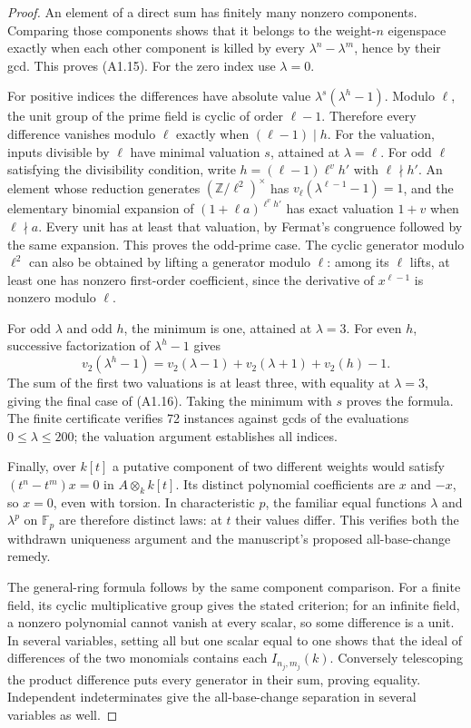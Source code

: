 \begin{proof}
An element of a direct sum has finitely many nonzero components.
Comparing those components shows that it belongs to the weight-$n$
eigenspace exactly when each other component is killed by every
$\lambda^n-\lambda^m$, hence by their gcd. This proves (A1.15).
For the zero index use $\lambda=0$.

For positive indices the differences have absolute value
$\lambda^s(\lambda^h-1)$. Modulo $\ell$, the unit group of the prime
field is cyclic of order $\ell-1$. Therefore every difference vanishes
modulo $\ell$ exactly when $(\ell-1)\mid h$. For the valuation, inputs
divisible by $\ell$ have minimal valuation $s$, attained at $\lambda=\ell$.
For odd $\ell$ satisfying the divisibility condition, write
$h=(\ell-1)\ell^v h'$ with $\ell\nmid h'$. An element whose reduction
generates $(\mathbb Z/\ell^2)^\times$ has
$v_\ell(\lambda^{\ell-1}-1)=1$, and the elementary binomial expansion
of $(1+\ell a)^{\ell^v h'}$ has exact valuation $1+v$ when
$\ell\nmid a$. Every unit has at least that valuation, by Fermat's
congruence followed by the same expansion. This proves the odd-prime
case. The cyclic generator modulo $\ell^2$ can also be obtained by
lifting a generator modulo $\ell$: among its $\ell$ lifts, at least
one has nonzero first-order coefficient, since the derivative of
$x^{\ell-1}$ is nonzero modulo $\ell$.

For odd $\lambda$ and odd $h$, the minimum is one, attained at
$\lambda=3$. For even $h$, successive factorization of
$\lambda^h-1$ gives
\[
 v_2(\lambda^h-1)
   =v_2(\lambda-1)+v_2(\lambda+1)+v_2(h)-1.
\]
The sum of the first two valuations is at least three, with equality
at $\lambda=3$, giving the final case of (A1.16). Taking the minimum
with $s$ proves the formula. The finite certificate verifies 72
instances against gcds of the evaluations $0\leq\lambda\leq200$;
the valuation argument establishes all indices.

Finally, over $k[t]$ a putative component of two different weights
would satisfy $(t^n-t^m)x=0$ in $A\otimes_k k[t]$. Its distinct
polynomial coefficients are $x$ and $-x$, so $x=0$, even with torsion.
In characteristic $p$, the familiar equal functions $\lambda$ and
$\lambda^p$ on $\mathbb F_p$ are therefore distinct laws: at $t$ their
values differ. This verifies both the withdrawn uniqueness argument
and the manuscript's proposed all-base-change remedy.

The general-ring formula follows by the same component comparison.
For a finite field, its cyclic multiplicative group gives the stated
criterion; for an infinite field, a nonzero polynomial cannot vanish
at every scalar, so some difference is a unit. In several variables,
setting all but one scalar equal to one shows that the ideal of
differences of the two monomials contains each $I_{n_j,m_j}(k)$.
Conversely telescoping the product difference puts every generator
in their sum, proving equality. Independent indeterminates give the
all-base-change separation in several variables as well.
\end{proof}

